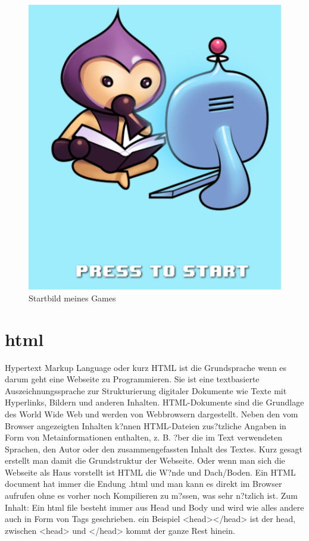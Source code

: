 \documentclass{article}
\begin{document}
\begin{figure}[ht]
    \centering
    \includegraphics[width=.7\linewidth]{foto}
    \caption{Startbild meines Games}
    \label{fig:sub1}
    \end{figure}

\cleardoublepage












\section{html}
Hypertext Markup Language oder kurz HTML ist die Grundsprache wenn es darum geht eine Webseite zu Programmieren.
 Sie ist eine textbasierte Auszeichnungssprache zur Strukturierung digitaler Dokumente wie Texte mit Hyperlinks, Bildern und anderen Inhalten.
 HTML-Dokumente sind die Grundlage des World Wide Web und werden von Webbrowsern dargestellt.
 Neben den vom Browser angezeigten Inhalten k?nnen HTML-Dateien zus?tzliche Angaben in Form von Metainformationen enthalten, z. B.
?ber die im Text verwendeten Sprachen, den Autor oder den zusammengefassten Inhalt des Textes.
Kurz gesagt erstellt man damit die Grundstruktur der Webseite.
Oder wenn man sich die Webseite als Haus vorstellt ist HTML die W?nde und Dach/Boden.
Ein HTML document hat immer die Endung .html und man kann es direkt im Browser aufrufen ohne es vorher noch Kompilieren zu m?ssen, was sehr n?tzlich ist.
Zum Inhalt:
Ein html file besteht immer aus Head und Body und wird wie alles andere auch in Form von Tags geschrieben.
ein Beispiel <head></head> ist der head, zwischen <head> und </head> kommt der ganze Rest hinein.
\end{document}
